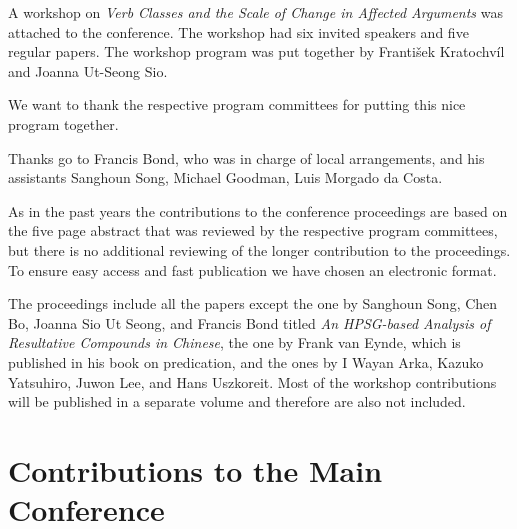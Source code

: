 \documentclass[11pt,a4paper,fleqn]{article}
\begin{document}
A workshop on \emph{Verb Classes and the Scale of Change in Affected Arguments}
was attached to the conference. The workshop had six invited speakers and 
five regular papers. The workshop program was put together by František Kratochvíl and Joanna Ut-Seong Sio.

We want to thank the respective program committees for putting this nice program together.

Thanks go to Francis Bond, who was
in charge of local arrangements, and his assistants Sanghoun Song, Michael Goodman,  Luis Morgado da Costa.
 

As in the past years the contributions to the conference proceedings are based on the five page abstract
that was reviewed by the respective program committees, but there is no additional reviewing of the
longer contribution to the proceedings.
To ensure easy access and fast publication we have chosen an electronic format.

The proceedings include all the papers except the one by Sanghoun Song, Chen Bo, Joanna Sio Ut
Seong, and Francis Bond titled \emph{An HPSG-based Analysis of Resultative Compounds in Chinese},
the one by Frank van Eynde, which is published in his book on predication, and the ones by I Wayan
Arka, Kazuko Yatsuhiro, Juwon Lee, and Hans
Uszkoreit. Most of the workshop contributions will be published in a separate volume and therefore
are also not included.





\newpage
\part{Contributions to the Main Conference}
\thispagestyle{empty}
\newpage
        \setcounter{page}{6}
\thispagestyle{empty}
\end{document}
